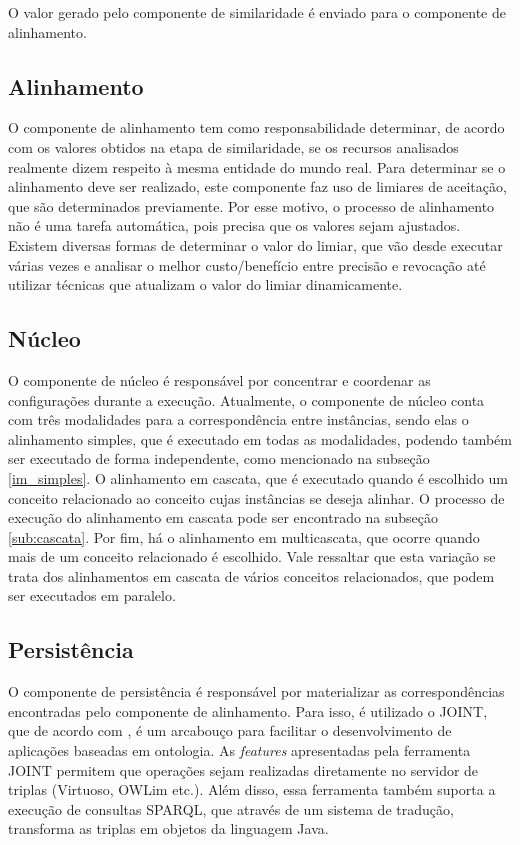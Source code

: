 


O valor gerado pelo componente de similaridade é enviado para o componente de alinhamento.

\subsection{Alinhamento}
O componente de alinhamento tem como responsabilidade determinar, de acordo com os valores obtidos na etapa de similaridade, se os recursos analisados realmente dizem respeito à mesma entidade do mundo real. Para determinar se o alinhamento deve ser realizado, este componente faz uso de limiares de aceitação, que são determinados previamente. Por esse motivo, o processo de alinhamento não é uma tarefa automática, pois precisa que os valores sejam ajustados. Existem diversas formas de determinar o valor do limiar, que vão desde executar várias vezes e analisar o melhor custo/benefício entre precisão e revocação até utilizar técnicas que atualizam o valor do limiar dinamicamente.


\subsection{Núcleo}
O componente de núcleo é responsável por concentrar e coordenar as configurações durante a execução. Atualmente, o componente de núcleo conta com três modalidades para a correspondência entre instâncias, sendo elas o alinhamento simples, que é executado em todas as modalidades, podendo também ser executado de forma independente, como mencionado na subseção \ref{im_simples}. O alinhamento em cascata, que é executado quando é escolhido um conceito relacionado ao conceito cujas instâncias se deseja alinhar. O processo de execução do alinhamento em cascata pode ser encontrado na subseção \ref{sub:cascata}. Por fim, há o alinhamento em multicascata, que ocorre quando mais de um conceito relacionado é escolhido. Vale ressaltar que esta variação se trata dos alinhamentos em cascata de vários conceitos relacionados, que podem ser executados em paralelo.


\subsection{Persistência}
O componente de persistência é responsável por materializar as correspondências encontradas pelo componente de alinhamento. Para isso, é utilizado o JOINT, que de acordo com , é um arcabouço para facilitar o desenvolvimento de aplicações baseadas em ontologia. As \textit{features} apresentadas pela ferramenta JOINT permitem que operações sejam realizadas diretamente no servidor de triplas (Virtuoso, OWLim etc.). Além disso, essa ferramenta também suporta a execução de consultas SPARQL, que através de um sistema de tradução, transforma as triplas em objetos da linguagem Java.


